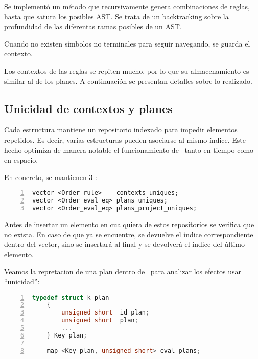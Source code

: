 Se implementó un método que recursivamente genera combinaciones de reglas, hasta que satura los posibles AST. Se trata de un backtracking sobre la profundidad de las diferentas ramas posibles de un AST.

Cuando no existen símbolos no terminales para seguir navegando, se guarda el contexto.

Los contextos de las reglas se repiten mucho, por lo que su almacenamiento es similar al de los planes. A continuación se presentan detalles sobre lo realizado.

\subsection{Unicidad de contextos y planes}

Cada estructura mantiene un repositorio indexado para impedir elementos repetidos. Es decir, varias estructuras pueden asociarse al mismo índice. Este hecho optimiza de manera notable el funcionamiento de \maggen\ tanto en tiempo como en espacio.

En concreto, se mantienen 3 :

\begin{lstlisting}[numbers=left, linewidth=9cm]
vector <Order_rule>    contexts_uniques;
vector <Order_eval_eq> plans_uniques;
vector <Order_eval_eq> plans_project_uniques;
\end{lstlisting}

Antes de insertar un elemento en cualquiera de estos repositorios se verifica que no exista. En caso de que ya se encuentre, se devuelve el índice correspondiente dentro del vector, sino se insertará al final y se devolverá el índice del último elemento.

Veamos la repretacion de una plan dentro de \maggen\ para analizar los efectos usar ``unicidad'':

\begin{lstlisting}[numbers=left, linewidth=9cm, language=c++]
    typedef struct k_plan
    {
	    unsigned short  id_plan;
	    unsigned short	plan;
        ...
    } Key_plan;

	map <Key_plan, unsigned short> eval_plans;
\end{lstlisting}


